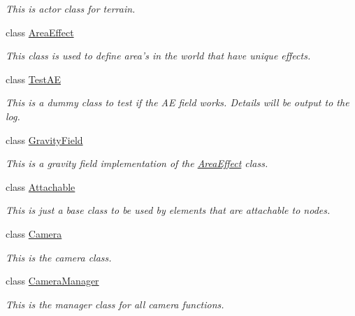 \begin{DoxyCompactItemize}
\begin{DoxyCompactList}\small\item\em This is actor class for terrain. \item\end{DoxyCompactList}\item 
class \hyperlink{classphys_1_1AreaEffect}{AreaEffect}
\begin{DoxyCompactList}\small\item\em This class is used to define area's in the world that have unique effects. \item\end{DoxyCompactList}\item 
class \hyperlink{classphys_1_1TestAE}{TestAE}
\begin{DoxyCompactList}\small\item\em This is a dummy class to test if the AE field works. Details will be output to the log. \item\end{DoxyCompactList}\item 
class \hyperlink{classphys_1_1GravityField}{GravityField}
\begin{DoxyCompactList}\small\item\em This is a gravity field implementation of the \hyperlink{classphys_1_1AreaEffect}{AreaEffect} class. \item\end{DoxyCompactList}\item 
class \hyperlink{classphys_1_1Attachable}{Attachable}
\begin{DoxyCompactList}\small\item\em This is just a base class to be used by elements that are attachable to nodes. \item\end{DoxyCompactList}\item 
class \hyperlink{classphys_1_1Camera}{Camera}
\begin{DoxyCompactList}\small\item\em This is the camera class. \item\end{DoxyCompactList}\item 
class \hyperlink{classphys_1_1CameraManager}{CameraManager}
\begin{DoxyCompactList}\small\item\em This is the manager class for all camera functions. \item\end{DoxyCompactList}\item 

\end{DoxyCompactItemize}
